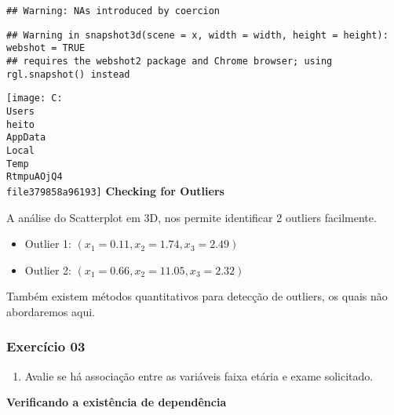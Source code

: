 \documentclass[
]{article}
\providecommand{\tightlist}{%
  \setlength{\itemsep}{0pt}\setlength{\parskip}{0pt}}
\begin{document}
\begin{verbatim}
## Warning: NAs introduced by coercion
\end{verbatim}

\begin{verbatim}
## Warning in snapshot3d(scene = x, width = width, height = height): webshot = TRUE
## requires the webshot2 package and Chrome browser; using rgl.snapshot() instead
\end{verbatim}

\texttt{[image: C:\\Users\\heito\\AppData\\Local\\Temp\\RtmpuAOjQ4\\file379858a96193]}
\textbf{Checking for Outliers}

A análise do Scatterplot em 3D, nos permite identificar 2 outliers
facilmente.

\begin{itemize}
\tightlist
\item
  Outlier 1: \((x_1 = 0.11, x_2 = 1.74, x_3=2.49)\)
\item
  Outlier 2: \((x_1 = 0.66, x_2 = 11.05, x_3=2.32)\)
\end{itemize}

Também existem métodos quantitativos para detecção de outliers, os quais
não abordaremos aqui.

\hypertarget{exercuxedcio-03}{%
\subsubsection{Exercício 03}\label{exercuxedcio-03}}

\begin{enumerate}
\def\labelenumi{\alph{enumi})}
\tightlist
\item
  Avalie se há associação entre as variáveis faixa etária e exame
  solicitado.
\end{enumerate}

\textbf{Verificando a existência de dependência}
\end{document}
